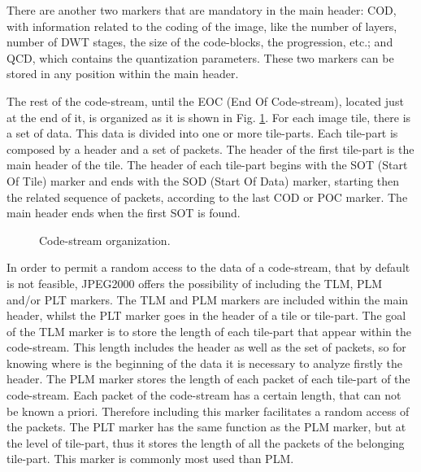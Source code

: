 There are another two markers that are mandatory in the main header:
COD, with information related to the coding of the image, like the
number of layers, number of DWT stages, the size of the code-blocks,
the progression, etc.; and QCD, which contains the quantization
parameters. These two markers can be stored in any position within the
main header.

The rest of the code-stream, until the EOC (End Of Code-stream),
located just at the end of it, is organized as it is shown
in Fig. \ref{fig:code-stream}. For each image tile, there is
a set of data. This data is divided into one or more tile-parts.
Each tile-part is composed by a header and a set of packets.
The header of the first tile-part is the main header of the tile.
The header of each tile-part begins with the SOT (Start Of Tile)
marker and ends with the SOD (Start Of Data) marker, starting then
the related sequence of packets, according to the last COD or POC
marker. The main header ends when the first SOT is found.

\begin{figure}[!t]
  \begin{center}
    \resizebox{0.65\textwidth}{!}{}
  \end{center}
  \caption{Code-stream organization.}
  \label{fig:code-stream}
\end{figure}

In order to permit a random access to the data of a code-stream,
that by default is not feasible, JPEG2000 offers the possibility
of including the TLM, PLM and/or PLT markers. The TLM and PLM markers
are included within the main header, whilst the PLT marker goes
in the header of a tile or tile-part. The goal of the TLM marker
is to store the length of each tile-part that appear within the
code-stream. This length includes the header as well
as the set of packets, so for knowing where is the beginning of the
data it is necessary to analyze firstly the header. The PLM marker
stores the length of each packet of each tile-part of the code-stream.
Each packet of the code-stream has a certain length, that can
not be known a priori. Therefore including this marker facilitates
a random access of the packets. The PLT marker has the same function
as the PLM marker, but at the level of tile-part, thus it stores
the length of all the packets of the belonging tile-part. This
marker is commonly most used than PLM. 

